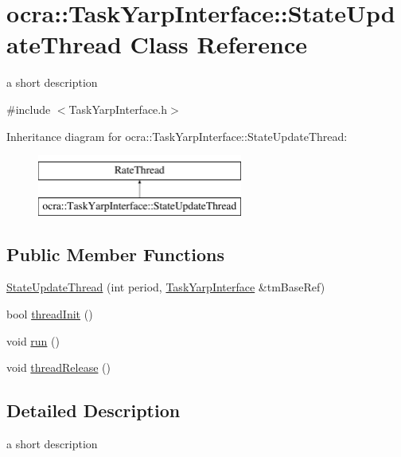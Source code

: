 \hypertarget{classocra_1_1TaskYarpInterface_1_1StateUpdateThread}{}\section{ocra\+:\+:Task\+Yarp\+Interface\+:\+:State\+Update\+Thread Class Reference}
\label{classocra_1_1TaskYarpInterface_1_1StateUpdateThread}


a short description  




{\ttfamily \#include $<$Task\+Yarp\+Interface.\+h$>$}

Inheritance diagram for ocra\+:\+:Task\+Yarp\+Interface\+:\+:State\+Update\+Thread\+:\begin{figure}[H]
\begin{center}
\leavevmode
\includegraphics[height=2.000000cm]{d7/dd6/classocra_1_1TaskYarpInterface_1_1StateUpdateThread}
\end{center}
\end{figure}
\subsection*{Public Member Functions}
\begin{DoxyCompactItemize}
\item 
\hyperlink{classocra_1_1TaskYarpInterface_1_1StateUpdateThread_acd0edcec12037183ec9b7aab8dafbd99}{State\+Update\+Thread} (int period, \hyperlink{classocra_1_1TaskYarpInterface}{Task\+Yarp\+Interface} \&tm\+Base\+Ref)
\item 
bool \hyperlink{classocra_1_1TaskYarpInterface_1_1StateUpdateThread_afb9499707c2ea4b76bb108d74294b1fb}{thread\+Init} ()
\item 
void \hyperlink{classocra_1_1TaskYarpInterface_1_1StateUpdateThread_ae6be513380cf7cd48fac252379536479}{run} ()
\item 
void \hyperlink{classocra_1_1TaskYarpInterface_1_1StateUpdateThread_a77b5d075d27975a99cffad39664df76b}{thread\+Release} ()
\end{DoxyCompactItemize}


\subsection{Detailed Description}
a short description 

